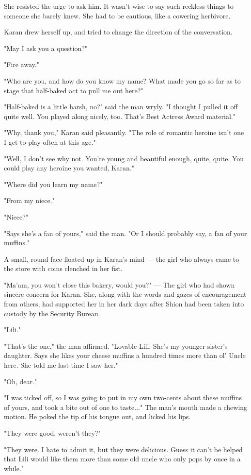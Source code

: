 She resisted the urge to ask him. It wasn't wise to say such reckless
things to someone she barely knew. She had to be cautious, like a
cowering herbivore.

Karan drew herself up, and tried to change the direction of the
conversation.

"May I ask you a question?"

"Fire away."

"Who are you, and how do you know my name? What made you go so far as to
stage that half-baked act to pull me out here?"

"Half-baked is a little harsh, no?" said the man wryly. "I thought I
pulled it off quite well. You played along nicely, too. That's Best
Actress Award material."

"Why, thank you," Karan said pleasantly. "The role of romantic heroine
isn't one I get to play often at this age."

"Well, I don't see why not. You're young and beautiful enough, quite,
quite. You could play any heroine you wanted, Karan."

"Where did you learn my name?"

"From my niece."

"Niece?"

"Says she's a fan of yours," said the man. "Or I should probably say, a
fan of your muffins."

A small, round face floated up in Karan's mind --- the girl who always
came to the store with coins clenched in her fist.

"Ma'am, you won't close this bakery, would you?" --- The girl who had
shown sincere concern for Karan. She, along with the words and gazes of
encouragement from others, had supported her in her dark days after
Shion had been taken into custody by the Security Bureau.

"Lili."

"That's the one," the man affirmed. "Lovable Lili. She's my younger
sister's daughter. Says she likes your cheese muffins a hundred times
more than ol' Uncle here. She told me last time I saw her."

"Oh, dear."

"I was ticked off, so I was going to put in my own two-cents about these
muffins of yours, and took a bite out of one to taste..." The man's
mouth made a chewing motion. He poked the tip of his tongue out, and
licked his lips.

"They were good, weren't they?"

"They were. I hate to admit it, but they were delicious. Guess it can't
be helped that Lili would like them more than some old uncle who only
pops by once in a while."

